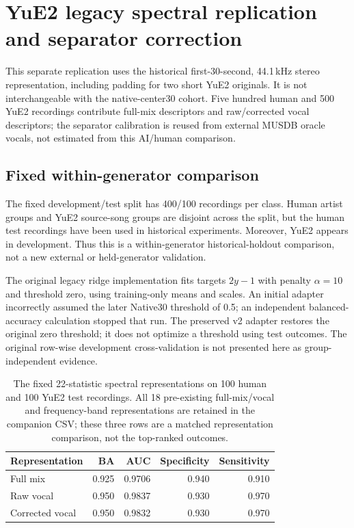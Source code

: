 \section{YuE2 legacy spectral replication and separator correction}

This separate replication uses the historical first-30-second, 44.1\,kHz
stereo representation, including padding for two short YuE2 originals. It is
not interchangeable with the native-center30 cohort. Five hundred human and
500 YuE2 recordings contribute full-mix descriptors and raw/corrected vocal
descriptors; the separator calibration is reused from external MUSDB oracle
vocals, not estimated from this AI/human comparison.

\subsection{Fixed within-generator comparison}
The fixed development/test split has 400/100 recordings per class. Human
artist groups and YuE2 source-song groups are disjoint across the split, but
the human test recordings have been used in historical experiments. Moreover,
YuE2 appears in development. Thus this is a within-generator historical-holdout
comparison, not a new external or held-generator validation.

The original legacy ridge implementation fits targets $2y-1$ with penalty
$\alpha=10$ and threshold zero, using training-only means and scales. An
initial adapter incorrectly assumed the later Native30 threshold of 0.5;
an independent balanced-accuracy calculation stopped that run. The preserved
v2 adapter restores the original zero threshold; it does not optimize a
threshold using test outcomes. The original row-wise development cross-validation
is not presented here as group-independent evidence.

\begin{table}[htbp]
\centering
\caption{The fixed 22-statistic spectral representations on 100 human and
100 YuE2 test recordings. All 18 pre-existing full-mix/vocal and frequency-band
representations are retained in the companion CSV; these three rows are a
matched representation comparison, not the top-ranked outcomes.}
\begin{tabular}{lrrrr}
\toprule
Representation & BA & AUC & Specificity & Sensitivity \\
\midrule
Full mix & 0.925 & 0.9706 & 0.940 & 0.910 \\
Raw vocal & 0.950 & 0.9837 & 0.930 & 0.970 \\
Corrected vocal & 0.950 & 0.9832 & 0.930 & 0.970 \\
\bottomrule
\end{tabular}
\end{table}

